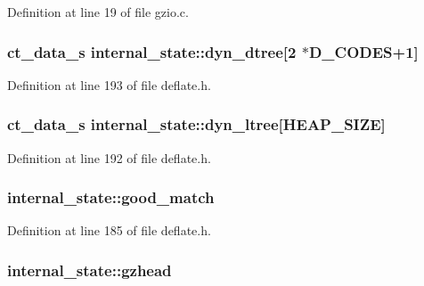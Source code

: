Definition at line 19 of file gzio.\-c.

\hypertarget{structinternal__state_a42a52476d3cde41e57a6ef2a6a78008f}{
\subsubsection[{dyn\-\_\-dtree}]{ {\bf ct\-\_\-data\-\_\-s} internal\-\_\-state\-::dyn\-\_\-dtree\mbox{[}2 $\ast$D\-\_\-\-C\-O\-D\-E\-S+1\mbox{]}}}\label{structinternal__state_a42a52476d3cde41e57a6ef2a6a78008f}


Definition at line 193 of file deflate.\-h.

\hypertarget{structinternal__state_ae11867c05d54c575dbc713bbea71266c}{
\subsubsection[{dyn\-\_\-ltree}]{ {\bf ct\-\_\-data\-\_\-s} internal\-\_\-state\-::dyn\-\_\-ltree\mbox{[}H\-E\-A\-P\-\_\-\-S\-I\-Z\-E\mbox{]}}}\label{structinternal__state_ae11867c05d54c575dbc713bbea71266c}


Definition at line 192 of file deflate.\-h.

\hypertarget{structinternal__state_a68ba00254242017f330dca5e0191bca4}{
\subsubsection[{good\-\_\-match}]{ internal\-\_\-state\-::good\-\_\-match}}\label{structinternal__state_a68ba00254242017f330dca5e0191bca4}


Definition at line 185 of file deflate.\-h.

\hypertarget{structinternal__state_ac023d0c9e6112dfe6cbd049a56484997}{
\subsubsection[{gzhead}]{ internal\-\_\-state\-::gzhead}}\label{structinternal__state_ac023d0c9e6112dfe6cbd049a56484997}


